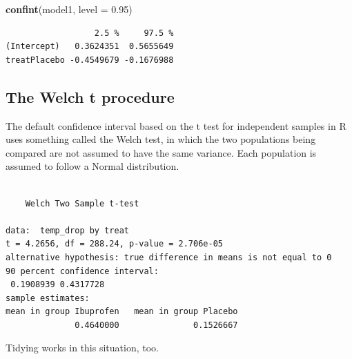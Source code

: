 \documentclass[
]{book}
\newenvironment{Shaded}{\begin{snugshade}}{\end{snugshade}}
\newcommand{\DataTypeTok}[1]{\textcolor[rgb]{0.13,0.29,0.53}{#1}}
\newcommand{\FloatTok}[1]{\textcolor[rgb]{0.00,0.00,0.81}{#1}}
\newcommand{\KeywordTok}[1]{\textcolor[rgb]{0.13,0.29,0.53}{\textbf{#1}}}
\newcommand{\NormalTok}[1]{#1}
\newcommand{\OperatorTok}[1]{\textcolor[rgb]{0.81,0.36,0.00}{\textbf{#1}}}
\newcommand{\StringTok}[1]{\textcolor[rgb]{0.31,0.60,0.02}{#1}}
\begin{document}
\begin{Shaded}
\begin{Highlighting}[]
\KeywordTok{confint}\NormalTok{(model1, }\DataTypeTok{level =} \FloatTok{0.95}\NormalTok{)}
\end{Highlighting}
\end{Shaded}

\begin{verbatim}
                  2.5 %     97.5 %
(Intercept)   0.3624351  0.5655649
treatPlacebo -0.4549679 -0.1676988
\end{verbatim}

\hypertarget{the-welch-t-procedure}{%
\subsection{The Welch t procedure}\label{the-welch-t-procedure}}

The default confidence interval based on the t test for independent samples in R uses something called the Welch test, in which the two populations being compared are not assumed to have the same variance. Each population is assumed to follow a Normal distribution.

\begin{Shaded}
\end{Shaded}

\begin{verbatim}

	Welch Two Sample t-test

data:  temp_drop by treat
t = 4.2656, df = 288.24, p-value = 2.706e-05
alternative hypothesis: true difference in means is not equal to 0
90 percent confidence interval:
 0.1908939 0.4317728
sample estimates:
mean in group Ibuprofen   mean in group Placebo 
              0.4640000               0.1526667 
\end{verbatim}

Tidying works in this situation, too.

\begin{Shaded}
\end{Shaded}
\end{document}
